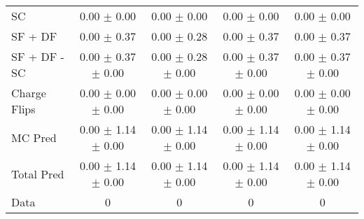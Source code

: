 \begin{tabular}{l|cccc}
                                 SC &  0.00 $\pm$  0.00 &  0.00 $\pm$  0.00 &  0.00 $\pm$  0.00 &  0.00 $\pm$  0.00 \\
                            SF + DF &  0.00 $\pm$  0.37 &  0.00 $\pm$  0.28 &  0.00 $\pm$  0.37 &  0.00 $\pm$  0.37 \\
\hline
                       SF + DF - SC &  0.00 $\pm$  0.37 $\pm$  0.00 &  0.00 $\pm$  0.28 $\pm$  0.00 &  0.00 $\pm$  0.37 $\pm$  0.00 &  0.00 $\pm$  0.37 $\pm$  0.00 \\
\hline\hline
                       Charge Flips &  0.00 $\pm$  0.00 $\pm$  0.00 &  0.00 $\pm$  0.00 $\pm$  0.00 &  0.00 $\pm$  0.00 $\pm$  0.00 &  0.00 $\pm$  0.00 $\pm$  0.00 \\
\hline
                            MC Pred &  0.00 $\pm$  1.14 $\pm$  0.00 &  0.00 $\pm$  1.14 $\pm$  0.00 &  0.00 $\pm$  1.14 $\pm$  0.00 &  0.00 $\pm$  1.14 $\pm$  0.00 \\
\hline
                         Total Pred &  0.00 $\pm$  1.14 $\pm$  0.00 &  0.00 $\pm$  1.14 $\pm$  0.00 &  0.00 $\pm$  1.14 $\pm$  0.00 &  0.00 $\pm$  1.14 $\pm$  0.00 \\
\hline\hline
                               Data &     0 &     0 &     0 &     0 \\
\hline\hline
\end{tabular}

